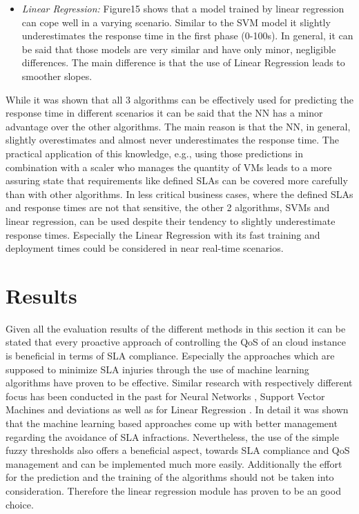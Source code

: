 \begin{itemize}
\item \textit{Linear Regression:} Figure15 shows that a model trained by linear regression can cope well in a varying scenario. Similar to the SVM model it slightly underestimates the response time in the first phase (0-100s). In general, it can be said that those models are very similar and have only minor, negligible differences. The main difference is that the use of Linear Regression leads to smoother slopes.
\end{itemize}

While it was shown that all 3 algorithms can be effectively used for predicting the response time in different scenarios it can be said that the NN has a minor advantage over the other algorithms. The main reason is that the NN, in general, slightly overestimates and almost never underestimates the response time. The practical application of this knowledge, e.g., using those predictions in combination with a scaler who manages the quantity of VMs leads to a more assuring state that requirements like defined SLAs can be covered more carefully than with other algorithms. In less critical business cases, where the defined SLAs and response times are not that sensitive, the other 2 algorithms, SVMs and linear regression, can be used despite their tendency to slightly underestimate response times. Especially the Linear Regression with its fast training and deployment times could be considered in near real-time scenarios.


\section{Results}
Given all the evaluation results of the different methods in this section it can be stated that every proactive approach of controlling the QoS of an cloud instance is beneficial in terms of SLA compliance. Especially the approaches which are supposed to minimize SLA injuries through the use of machine learning algorithms have proven to be effective. Similar research with respectively different focus has been conducted in the past for Neural Networks  \cite{6799665}  \cite{Prevost2011PredictionOC}, Support Vector Machines and deviations  \cite{6649686}  \cite{7194655} as well as for Linear Regression  \cite{6567848}  \cite{[6164809]}. In detail it was shown that the machine learning based approaches come up with better management regarding the avoidance of SLA infractions. Nevertheless, the use of the simple fuzzy thresholds also offers a beneficial aspect, towards SLA compliance and QoS management and can be implemented much more easily. Additionally the effort for the prediction and the training of the algorithms should not be taken into consideration. Therefore the linear regression module has proven to be an good choice.

